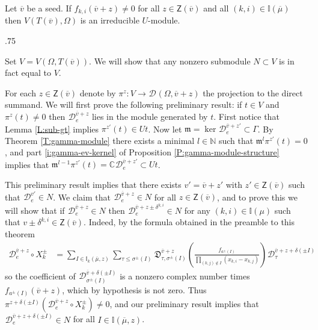\documentclass[11pt,fleqn]{amsart}
\makeatletter
\renewcommand\proofname{Proof}
\renewenvironment{proof}[1][\textit{\proofname}]{\par
 \pushQED{\qed}%
 \normalfont \topsep.75\paraskip\relax
 \trivlist
 \item[\hskip\labelsep
 \itshape
 #1\@addpunct{.}]\ignorespaces
}{%
 \popQED\endtrivlist\@endpefalse
}
\newcounter{para}[section]
\newcommand\NN{\mathbb N}
\newcommand\CC{\mathbb C}
\newcommand\II{\mathbb I}
\renewcommand\to{\longrightarrow}
\newcommand\D[3]{{}^{#1} \mathfrak D_{#2}^{#3}}
\newcommand\DD[3]{{}^{#1} \mathcal D_{#2}^{#3}}
\newcommand\Z{\mathsf Z}
\newcommand\m{\mathfrak m}
\newcommand\vv{\overline{v}}
\makeatother
\begin{document}
\begin{Theorem}
\label{T:simplicity}
Let $\vv$ be a seed. If $f_{k,i}(\vv + z) \neq 0$ for all $z \in \Z(\vv)$ and 
all $(k,i) \in \II(\overline \mu)$ then $V(T(\vv), \Omega)$ is an 
irreducible $U$-module.
\end{Theorem}
\begin{proof}
Set $V = V(\Omega, T(\vv))$. We will show that any nonzero submodule $N 
\subset V$ is in fact equal to $V$.

For each $z \in \Z(\vv)$ denote by $\pi^z:  V \to \DD{}{}{} (\Omega, \vv + z)$ 
the projection to the direct summand. 
We will first prove the following preliminary result: if $t \in V$ and 
$\pi^z(t) \neq 0$ then $\DD{}{e}{\vv +z}$ lies in the module 
generated by $t$. First notice that Lemma \ref{L:sub-gt} implies $\pi^{z'}(t) 
\in U t$. Now let $\m = \ker \DD{}{e}{\vv+z'} \subset \Gamma$. By Theorem 
\ref{T:gamma-module} there exists a minimal $l \in \NN$ such that $\m^l 
\pi^{z'}(t) = 0$, and part \ref{i:gamma-ev-kernel} of Proposition 
\ref{P:gamma-module-structure} implies that $\m^{l-1} \pi^{z'}(t) = \CC 
\DD{}{e}{\vv+z'} \subset U t$. 

This preliminary result implies that there exists $v' = \vv + z'$ with $z' \in 
\Z(\vv)$ such that $\DD{}{e}{v'} \in N$. We claim that $\DD{}{e}{\vv + z} \in 
N$ for all $z \in \Z(\vv)$, and to prove this we will show that if 
$\DD{}{e}{\vv + z} \in N$ then $\DD{}{e}{\vv + z \pm \delta^{k,i}} \in N$ for 
any $(k,i) \in \II(\mu)$ such that $v\pm \delta^{k,i} \in \Z(\vv)$. Indeed, by 
the formula obtained in the preamble to this theorem
\begin{align*}
\DD{}{e}{\vv + z} \circ X_k^\pm
	&= \sum_{I \in \II_k(\overline \mu, z)}
		\sum_{\tau \leq \sigma^\pm(I)}
			\D{}{\tau, \sigma^\pm(I)}{\vv + z} \left( 
				\frac{f_{a^\pm(I)}}{\displaystyle
					\prod_{(k,j) \notin I} (x_{k,i} - x_{k,j})} 
			\right) \DD{}{\tau}{\vv + z + \delta(\pm I)}
\end{align*}
so the coefficient of $\DD{}{\sigma^\pm(I)}{\vv + \delta(\pm I)}$ is a nonzero
complex number times $f_{a^\pm(I)}(\vv + z)$, which by hypothesis is not zero. 
Thus $\pi^{z + \delta(\pm I)} (\DD{}{e}{\vv + z} \circ X^\pm_k) \neq 0$, and 
our preliminary result implies that $\DD{}{e}{\vv + z + \delta(\pm I)} \in N$ 
for all $I \in \II(\overline \mu, z)$.


\end{proof}
\end{document}
